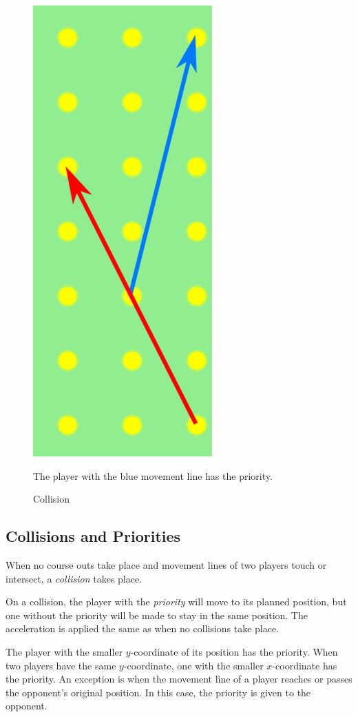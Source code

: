 \documentclass[11pt]{article}
\begin{document}
\begin{figure}
  \includegraphics[scale=0.183, natwidth=288, natheight=657]{cropped.png}
  \caption{Collision}
  \label{fig:collision}
  The player with the blue movement line has the priority.
  \vspace{-1cm}
\end{figure}

\subsection{Collisions and Priorities}
When no course outs take place and movement lines of two players touch
or intersect, a {\em collision} takes place.

On a collision, the player with the {\em priority} will move to its
planned position, but one without the priority will be made to stay in
the same position.  The acceleration is applied the same as when no
collisions take place.

The player with the smaller $y$-coordinate of its position has the
priority.  When two players have the same $y$-coordinate, one with the
smaller $x$-coordinate has the priority.  An exception is when the
movement line of a player reaches or passes the opponent's original
position.  In this case, the priority is given to the opponent.
\end{document}
